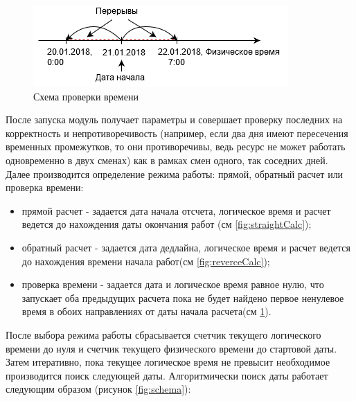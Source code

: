 \begin{figure}[h!]
	\centering
	\includegraphics[width=0.7\linewidth]{pics/scheduleCheckCalc.png}
	\caption{Схема проверки времени}
	\label{fig:checkCalc}
\end{figure}

\indent После запуска модуль получает параметры и совершает проверку последних на корректность и непротиворечивость (например, если два дня имеют пересечения временных промежутков, то они противоречивы, ведь ресурс не может работать одновременно в двух сменах) как в рамках смен одного, так соседних дней.
Далее производится определение режима работы: прямой, обратный расчет или проверка времени:

\begin{itemize}
	\item прямой расчет - задается дата начала отсчета, логическое время и расчет ведется до нахождения даты окончания работ (см \ref{fig:straightCalc});
	\item обратный расчет - задается дата дедлайна, логическое время и расчет ведется до нахождения времени начала работ(см \ref{fig:reverceCalc});
	\item проверка времени - задается дата и логическое время равное нулю, что запускает оба предыдущих расчета пока не будет найдено первое ненулевое время в обоих направлениях от даты начала расчета(см \ref{fig:checkCalc}).
\end{itemize}

\indent После выбора режима работы сбрасывается счетчик текущего логического времени до нуля и счетчик текущего физического времени до стартовой даты. Затем итеративно, пока текущее логическое время не превысит необходимое производится поиск следующей даты.
Алгоритмически поиск даты работает следующим образом (рисунок \ref{fig:schema}):

